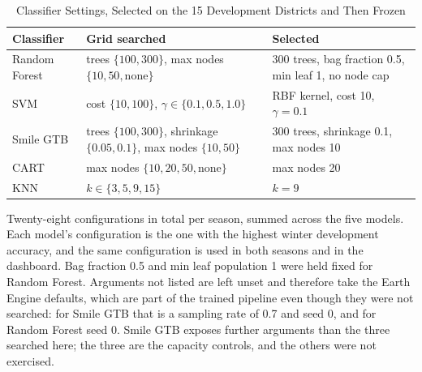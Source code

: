 \documentclass[conference]{IEEEtran}
\begin{document}
\begin{table}[!htbp]
\caption{Classifier Settings, Selected on the 15 Development Districts and Then Frozen}
\label{tab_hyper}
\begin{center}
\setlength{\tabcolsep}{3.5pt}
\begin{tabular}{lp{3.0cm}p{3.1cm}}
\toprule
\textbf{Classifier} & \textbf{Grid searched} & \textbf{Selected} \\
\midrule
Random Forest & trees $\{100,300\}$, max nodes $\{10,50,\text{none}\}$ & 300 trees, bag fraction 0.5, min leaf 1, no node cap \\
SVM           & cost $\{10,100\}$, $\gamma\in\{0.1,0.5,1.0\}$ & RBF kernel, cost 10, $\gamma=0.1$ \\
Smile GTB     & trees $\{100,300\}$, shrinkage $\{0.05,0.1\}$, max nodes $\{10,50\}$ & 300 trees, shrinkage 0.1, max nodes 10 \\
CART          & max nodes $\{10,20,50,\text{none}\}$ & max nodes 20 \\
KNN           & $k\in\{3,5,9,15\}$ & $k=9$ \\
\bottomrule
\end{tabular}

\vspace{2pt}
\parbox{\columnwidth}{\footnotesize Twenty-eight configurations in total per season, summed across the five models. Each model's configuration is the one with the highest winter development accuracy, and the same configuration is used in both seasons and in the dashboard. Bag fraction 0.5 and min leaf population 1 were held fixed for Random Forest. Arguments not listed are left unset and therefore take the Earth Engine defaults, which are part of the trained pipeline even though they were not searched: for Smile GTB that is a sampling rate of 0.7 and seed 0, and for Random Forest seed 0. Smile GTB exposes further arguments than the three searched here; the three are the capacity controls, and the others were not exercised.}
\end{center}
\end{table}
\end{document}
